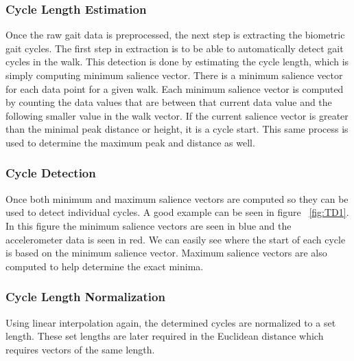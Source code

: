 \documentclass{sig-alternate}
\begin{document}
\subsubsection{Cycle Length Estimation}
Once the raw gait data is preprocessed, the next step is extracting the biometric gait cycles. The first step in extraction is to be able to automatically detect gait cycles in the walk. This detection is done by estimating the cycle length, which is simply computing minimum salience vector. There is a minimum salience vector for each data point for a given walk. Each minimum salience vector is computed by counting the data values that are between that current data value and the following smaller value in the walk vector. If the current salience vector is greater than the minimal peak distance or height, it is a cycle start. This same process is used to determine the maximum peak and distance as well.
\subsubsection{Cycle Detection}
Once both minimum and maximum salience vectors are computed so they can be used to detect individual cycles. A good example can be seen in figure ~\ref{fig:TD1}. In this figure the minimum salience vectors are seen in blue and the accelerometer data is seen in red. We can easily see where the start of each cycle is based on the minimum salience vector. Maximum salience vectors are also computed to help determine the exact minima.
\subsubsection{Cycle Length Normalization}
Using linear interpolation again, the determined cycles are normalized to a set length. These set lengths are later required in the Euclidean distance which requires vectors of the same length.
\end{document}
